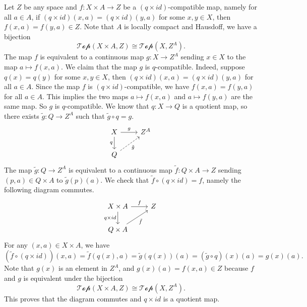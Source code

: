 \documentclass[letterpaper, 12pt]{article}
\begin{document}
\begin{solution}
Let \(Z\) be any space and \(f:X\times A\rightarrow Z\) be a \((q\times id)\)-compatible map, namely for all \(a\in A\), if \((q\times id)(x,a)=(q\times id)(y,a)\) for some \(x,y\in X\), then \(f(x,a)=f(y,a)\in Z\). Note that \(A\) is locally compact and Hausdoff, we have a bijection
\[\mathcal{Top}(X\times A,Z)\cong \mathcal{Top}(X,Z^A).\]
The map \(f\) is equivalent to a continuous map \(g:X\rightarrow Z^A\) sending \(x\in X\) to the map \(a\mapsto f(x,a)\). We claim that the map \(g\) is \(q\)-compatible. Indeed, suppose \(q(x)=q(y)\) for some \(x,y\in X\), then \((q\times id)(x,a)=(q\times id)(y,a)\) for all \(a\in A\). Since the map \(f\) is \((q\times id)\)-compatible, we have \(f(x,a)=f(y,a)\) for all \(a\in A\). This implies the two maps \(a\mapsto f(x,a)\) and \(a\mapsto f(y,a)\) are the same map. So \(g\) is \(q\)-compatible. We know that \(q:X\rightarrow Q\) is a quotient map, so there exists \(\tilde{g}:Q\rightarrow Z^A\) such that \(\tilde{g}\circ q=g\).
\[\begin{tikzcd}
	X & {Z^A} \\
	Q
	\arrow["g", from=1-1, to=1-2]
	\arrow["q"', from=1-1, to=2-1]
	\arrow["{\tilde{g}}"', dashed, from=2-1, to=1-2]
\end{tikzcd}\]
The map \(\tilde{g}:Q\rightarrow Z^A\) is equivalent to a continuous map \(\tilde{f}:Q\times A\rightarrow Z\) sending \((p,a)\in Q\times A\) to \(\tilde{g}(p)(a)\). We check that \(\tilde{f}\circ (q\times id)=f\), namely the following diagram commutes. 
\[\begin{tikzcd}
	{X\times A} & Z \\
	{Q\times A}
	\arrow["f", from=1-1, to=1-2]
	\arrow["{q\times id}"', from=1-1, to=2-1]
	\arrow["{\tilde{f}}"', from=2-1, to=1-2]
\end{tikzcd}\] 
For any \((x,a)\in X\times A\), we have 
\[(\tilde{f}\circ (q\times id))(x,a)=\tilde{f}(q(x),a)=\tilde{g}(q(x))(a)=(\tilde{g}\circ q)(x)(a)=g(x)(a).\]
Note that \(g(x)\) is an element in \(Z^A\), and \(g(x)(a)=f(x,a)\in Z\) because \(f\) and \(g\) is equivalent under the bijection 
\[\mathcal{Top}(X\times A,Z)\cong \mathcal{Top}(X,Z^A).\]
This proves that the diagram commutes and \(q\times id\) is a quotient map.    
\end{solution}
\end{document}
